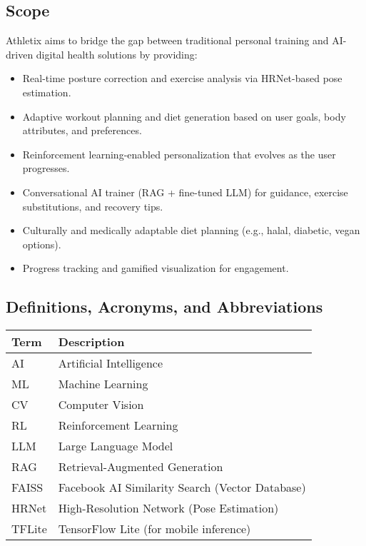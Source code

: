 \documentclass[12pt,a4paper]{article}
\begin{document}
\subsection{Scope}
Athletix aims to bridge the gap between traditional personal training and AI-driven digital health solutions by providing:

\begin{itemize}[leftmargin=*]
    \item Real-time posture correction and exercise analysis via HRNet-based pose estimation.
    \item Adaptive workout planning and diet generation based on user goals, body attributes, and preferences.
    \item Reinforcement learning-enabled personalization that evolves as the user progresses.
    \item Conversational AI trainer (RAG + fine-tuned LLM) for guidance, exercise substitutions, and recovery tips.
    \item Culturally and medically adaptable diet planning (e.g., halal, diabetic, vegan options).
    \item Progress tracking and gamified visualization for engagement.
\end{itemize}

\subsection{Definitions, Acronyms, and Abbreviations}
\begin{table}[h!]
\centering
\begin{tabular}{>{\raggedright\arraybackslash}p{3cm}>{\raggedright\arraybackslash}p{10cm}}
\toprule
\textbf{Term} & \textbf{Description} \\
\midrule
AI & Artificial Intelligence \\
ML & Machine Learning \\
CV & Computer Vision \\
RL & Reinforcement Learning \\
LLM & Large Language Model \\
RAG & Retrieval-Augmented Generation \\
FAISS & Facebook AI Similarity Search (Vector Database) \\
HRNet & High-Resolution Network (Pose Estimation) \\
TFLite & TensorFlow Lite (for mobile inference) \\
\bottomrule
\end{tabular}
\end{table}
\end{document}

